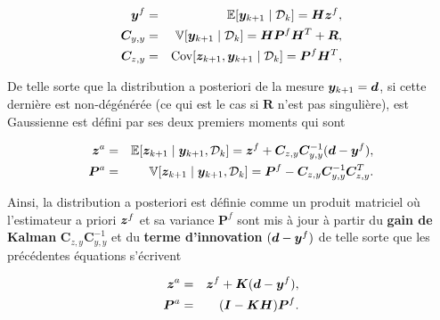 \begin{eqnarray*}
    \bm{y}^f &=& \mathbb{E} [\bm y_{k+1} \mid \mathcal D_k] = \bm H \bm z^f,\\
    \bm C_{y,y}&=&\mathbb{V} [\bm y_{k+1} \mid \mathcal D_k] = \bm H \bm  P^f \bm H^T + \bm R, \\
    \bm C_{z,y} &=& \text{Cov}[\bm z_{k+1}, \bm y_{k+1}\mid \mathcal D_k] =\bm  P^f \bm H^T,
\end{eqnarray*}

De telle sorte que la distribution a posteriori de la mesure $\bm{y}_{k+1} = \bm d$, si cette dernière est non-dégénérée (ce qui est le cas si $\bm R$ n'est pas singulière), est Gaussienne est défini par ses deux premiers moments qui sont

\begin{eqnarray*}
    \bm z^a &=& \mathbb{E}[\bm z_{k+1} \mid \bm y_{k+1},\mathcal D_k] = \bm z^f + \bm C_{z,y} \bm C_{y,y}^{-1} (\bm d - \bm{y}^f), \\
    \bm  P^a &=& \mathbb{V}[\bm z_{k+1} \mid \bm y_{k+1},\mathcal D_k] = \bm  P^f - \bm C_{z,y} \bm C_{y,y}^{-1} \bm C_{z,y}^T.
\end{eqnarray*}

Ainsi, la distribution a posteriori est définie comme un produit matriciel où l'estimateur a priori $\bm z^f$ et sa variance $\bm  P^f$ sont mis à jour à partir du \textbf{gain de Kalman} $\bm C_{z,y} \bm C_{y,y}^{-1}$ et du \textbf{terme d'innovation} $(\bm{d} - \bm{y}^f)$ de telle sorte que les précédentes équations s'écrivent

\begin{eqnarray*}
    \bm z^a &=& \bm z^f + \bm K (\bm{d} - \bm{y}^f), \\
    \bm  P^a &=& (\bm I - \bm K\bm H)\bm  P^f. \\
\end{eqnarray*}


